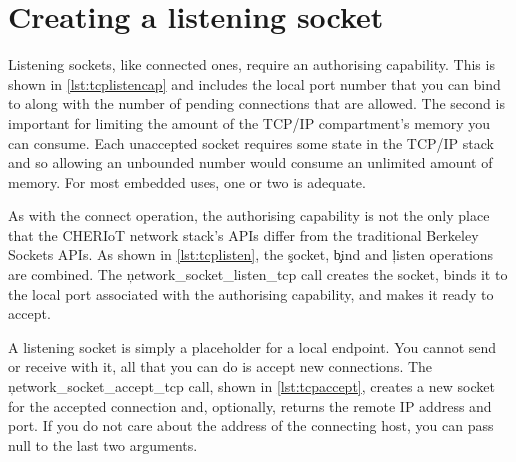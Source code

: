 {

\section{Creating a listening socket}

Listening sockets, like connected ones, require an authorising capability.
This is shown in \ref{lst:tcplistencap} and includes the local port number that you can bind to along with the number of pending connections that are allowed.
The second is important for limiting the amount of the TCP/IP compartment's memory you can consume.
Each unaccepted socket requires some state in the TCP/IP stack and so allowing an unbounded number would consume an unlimited amount of memory.
For most embedded uses, one or two is adequate.

\codelisting[filename=examples/tcp_echo_server/tcp.cc,marker=server_capability,label=lst:tcplistencap,caption="A static capability that authorises binding to a local port."]{}

As with the connect operation, the authorising capability is not the only place that the CHERIoT network stack's APIs differ from the traditional Berkeley Sockets APIs.
As shown in \ref{lst:tcplisten}, the \c{socket}, \c{bind} and \c{listen} operations are combined.
The \c{network_socket_listen_tcp} call creates the socket, binds it to the local port associated with the authorising capability, and makes it ready to accept.

\codelisting[filename=examples/tcp_echo_server/tcp.cc,marker=listen,label=lst:tcplisten,caption="Listening for TCP connections to a local port."]{}

A listening socket is simply a placeholder for a local endpoint.
You cannot send or receive with it, all that you can do is accept new connections.
The \c{network_socket_accept_tcp} call, shown in \ref{lst:tcpaccept}, creates a new socket for the accepted connection and, optionally, returns the remote IP address and port.
If you do not care about the address of the connecting host, you can pass null to the last two arguments.

}
